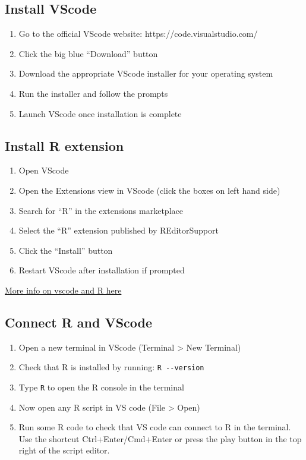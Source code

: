\documentclass[
  letterpaper,
  DIV=11,
  numbers=noendperiod]{scrreprt}
\providecommand{\tightlist}{%
  \setlength{\itemsep}{0pt}\setlength{\parskip}{0pt}}\usepackage{longtable,booktabs,array}
\begin{document}
\subsection{Install VScode}\label{install-vscode}

\begin{enumerate}
\def\labelenumi{\arabic{enumi}.}
\tightlist
\item
  Go to the official VScode website: https://code.visualstudio.com/
\item
  Click the big blue ``Download'' button
\item
  Download the appropriate VScode installer for your operating system
\item
  Run the installer and follow the prompts
\item
  Launch VScode once installation is complete
\end{enumerate}

\subsection{Install R extension}\label{install-r-extension}

\begin{enumerate}
\def\labelenumi{\arabic{enumi}.}
\tightlist
\item
  Open VScode
\item
  Open the Extensions view in VScode (click the boxes on left hand side)
\item
  Search for ``R'' in the extensions marketplace
\item
  Select the ``R'' extension published by REditorSupport
\item
  Click the ``Install'' button
\item
  Restart VScode after installation if prompted
\end{enumerate}

\href{https://code.visualstudio.com/docs/languages/r}{More info on
vscode and R here}

\subsection{Connect R and VScode}\label{connect-r-and-vscode}

\begin{enumerate}
\def\labelenumi{\arabic{enumi}.}
\tightlist
\item
  Open a new terminal in VScode (Terminal \textgreater{} New Terminal)
\item
  Check that R is installed by running: \texttt{R\ -\/-version}
\item
  Type \texttt{R} to open the R console in the terminal
\item
  Now open any R script in VS code (File \textgreater{} Open)
\item
  Run some R code to check that VS code can connect to R in the
  terminal. Use the shortcut Ctrl+Enter/Cmd+Enter or press the play
  button in the top right of the script editor.
\end{enumerate}
\end{document}
